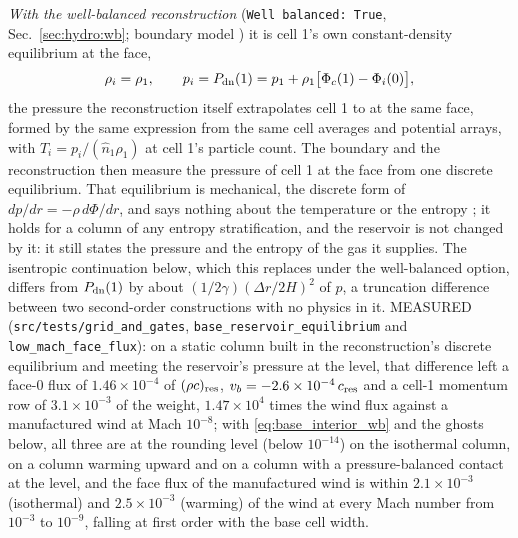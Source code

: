 \emph{With the well-balanced reconstruction} (\texttt{Well balanced: True},
Sec.~\ref{sec:hydro:wb}; boundary model
) it is cell 1's own
constant-density equilibrium at the face,
%
\begin{equation}
  \rho_i = \rho_1, \qquad
  p_i = P_{\rm dn}(1) = p_1 + \rho_1\bigl[\Phi_c(1) - \Phi_i(0)\bigr],
  \label{eq:base_interior_wb}
\end{equation}
%
the pressure the reconstruction itself extrapolates cell 1 to at the same
face, formed by the same expression from the same cell averages and
potential arrays, with $T_i = p_i/(\hat n_1\rho_1)$ at cell 1's particle
count.  The boundary and the reconstruction then measure the pressure of
cell 1 at the face from one discrete equilibrium.  That equilibrium is
mechanical, the discrete form of $dp/dr = -\rho\,d\Phi/dr$, and says nothing
about the temperature or the entropy \citep[Sect.~2.1]{Kaeppeli2016}; it
holds for a column of any entropy stratification, and the reservoir is not
changed by it: it still states the pressure and the entropy of the gas it
supplies.  The isentropic continuation below, which this replaces under the
well-balanced option, differs from $P_{\rm dn}(1)$ by about
$(1/2\gamma)(\Delta r/2H)^2$ of $p$, a truncation difference between two
second-order constructions with no physics in it.  MEASURED
(\texttt{src/tests/grid\_and\_gates}, \texttt{base\_reservoir\_equilibrium}
and \texttt{low\_mach\_face\_flux}): on a static column built in the
reconstruction's discrete equilibrium and meeting the reservoir's pressure at
the level, that difference left a face-0 flux of $1.46\times10^{-4}$ of
$(\rho c)_{\rm res}$, $v_b = -2.6\times10^{-4}\,c_{\rm res}$ and a cell-1
momentum row of $3.1\times10^{-3}$ of the weight, $1.47\times10^4$ times the
wind flux against a manufactured wind at Mach $10^{-8}$; with
\eqref{eq:base_interior_wb} and the ghosts below, all three are at the
rounding level (below $10^{-14}$) on the isothermal column, on a column
warming upward and on a column with a pressure-balanced contact at the level,
and the face flux of the manufactured wind is within $2.1\times10^{-3}$
(isothermal) and $2.5\times10^{-3}$ (warming) of the wind at every Mach number
from $10^{-3}$ to $10^{-9}$, falling at first order with the base cell width.

